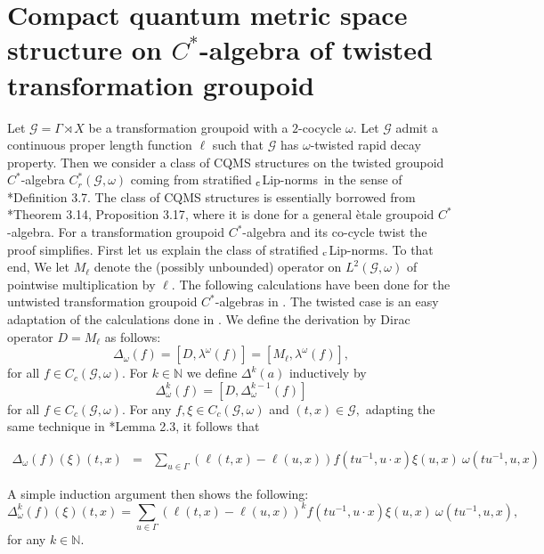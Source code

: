 \documentclass[a4paper,11pt,reqno]{amsart}
\theoremstyle{plain}
\theoremstyle{mainthmstyle}
\theoremstyle{named}
\numberwithin{equation}{section}
\newcommand{\Bea}{\begin{eqnarray*}}
\newcommand{\Eea}{\end{eqnarray*}}
\newcommand{\clipnorms}{$_{\text{\rm c}}$Lip-norms}
\begin{document}
\section{Compact quantum metric space structure on \texorpdfstring{$C^{\ast}$}{C*-}-algebra of twisted transformation groupoid} Let $\mathcal{G}=\Gamma\rtimes X$ be a transformation groupoid with a $2$-cocycle $\omega$. Let $\mathcal{G}$ admit a continuous proper length function $\ell$ such that $\mathcal{G}$ has $\omega$-twisted rapid decay property. Then we consider a class of CQMS structures on the twisted groupoid $C^{\ast}$-algebra $C^{\ast}_{r}(\mathcal{G},\omega)$ coming from stratified \clipnorms\ in the sense of \cite{austad2026quantum}*{Definition 3.7}. The class of CQMS structures is essentially borrowed from \cite{austad2026quantum}*{Theorem 3.14, Proposition 3.17}, where it is done for a general \`etale groupoid $C^{\ast}$-algebra. For a transformation groupoid $C^{\ast}$-algebra and its co-cycle twist the proof simplifies. First let us explain the class of stratified \clipnorms. To that end, We let $M_{\ell}$ denote the (possibly unbounded) operator on $L^2 (\mathcal G, \omega)$ of pointwise multiplication by $\ell.$ The following calculations have been done for the untwisted transformation groupoid $C^{\ast}$-algebras in \cite{joardar2025metrics}. The twisted case is an easy adaptation of the calculations done in \cite{joardar2025metrics}. We define the derivation by Dirac operator $D = M_{\ell}$ as follows: 
$$\Delta_{\omega} (f) = \left [D, \lambda^{\omega} (f) \right ] = \left [M_{\ell}, \lambda^{\omega} (f) \right ],$$ for all $f \in C_c (\mathcal G, \omega).$ For $k \in \mathbb N$ we define $\Delta^k (a)$ inductively by 
$$\Delta_{\omega}^k (f) = \left [D, \Delta_{\omega}^{k-1} (f) \right ]$$ 
for all $f \in C_c (\mathcal G, \omega).$ For any $f, \xi \in C_c (\mathcal G, \omega)$ and $(t,x) \in \mathcal G,$ adapting the same technique in \cite{joardar2025metrics}*{Lemma 2.3}, it follows that

\Bea
\Delta_{\omega} (f) (\xi) (t,x) & = & \sum\limits_{u \in \Gamma} \left (\ell (t, x) - \ell (u, x) \right ) f \left (t u^{-1}, u \cdot x \right ) \xi (u, x)\ \omega (t u^{-1}, u, x)
\Eea

\vspace{2mm}

A simple induction argument then shows the following: \begin{displaymath}\Delta_{\omega}^k (f) (\xi) (t,x) = \sum\limits_{u \in \Gamma} \left (\ell (t, x) - \ell (u, x) \right )^k f \left (t u^{-1}, u \cdot x \right ) \xi (u, x)\ \omega (t u^{-1}, u, x),\end{displaymath} for any $k \in \mathbb N.$
\end{document}
